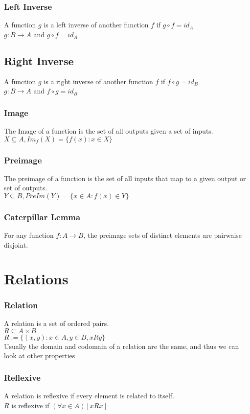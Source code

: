 \documentclass{article}
\begin{document}
\subsubsection*{Left Inverse}
A function $g$ is a left inverse of another function $f$ if $g \circ f = id_A$\\
$g : B \rightarrow A$ and $g \circ f = id_A$\\
\subsection*{Right Inverse}
A function $g$ is a right inverse of another function $f$ if $f \circ g = id_B$\\
$g : B \rightarrow A$ and $f \circ g = id_B$\\
\subsubsection*{Image}
The Image of a function is the set of all outputs given a set of inputs.\\
$X \subseteq A, Im_f(X) = \{f(x) : x \in X \}$
\subsubsection*{Preimage}
The preimage of a function is the set of all inputs that map to a given output or set of outputs.\\
$Y \subseteq B, PreIm(Y) = \{x \in A : f(x) \in Y\}$
\subsubsection*{Caterpillar Lemma}
For any function $f : A \rightarrow B$, the preimage sets of distinct elements are pairwaise disjoint.

\section{Relations}
\subsubsection*{Relation}
A relation is a set of ordered pairs.\\
$R \subseteq A \times B$\\
$R := \{(x,y): x\in A, y \in B, xRy\}$\\
Usually the domain and codomain of a relation are the same, and thus we can look at other properties 
\subsubsection*{Reflexive}
A relation is reflexive if every element is related to itself.\\
$R$ is reflexive if $(\forall x \in A)[xRx]$
\end{document}
